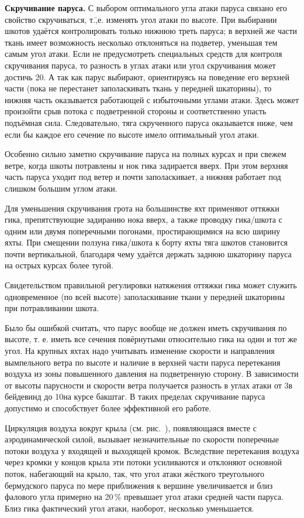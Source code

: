 \textbf{Скручивание паруса.}
 С выбором оптимального
угла атаки паруса связано его свойство скручиваться, т.\=,е. изменять
угол атаки по высоте. При выбирании шкотов удаётся контролировать
только нижнюю треть паруса; в верхней же части ткань имеет возможность
несколько отклоняться на подветер, уменьшая тем самым угол атаки. Если
не предусмотреть специальных средств для контроля скручивания паруса,
то разность в углах атаки или угол скручивания может достичь 20\gr. А
так как парус выбирают, ориентируясь на поведение его верхней части
(пока не перестанет заполаскивать ткань у передней шкаторины), то
нижняя часть оказывается работающей с избыточными углами атаки. Здесь
может произойти срыв потока с подветренной стороны и соответственно
упасть подъёмная сила. Следовательно, тяга скрученного паруса
оказывается ниже, чем если бы каждое его сечение по высоте имело
оптимальный угол атаки.

Особенно сильно заметно скручивание паруса на полных курсах и при
свежем ветре, когда шкоты потравлены и нок гика задирается вверх. При
этом верхняя часть паруса уходит под ветер и почти заполаскивает, а
нижняя работает под слишком большим углом атаки.

Для уменьшения скручивания грота на большинстве яхт применяют оттяжки
гика, препятствующие задиранию нока вверх, а также проводку
гика\-/шкота с одним или двумя поперечными погонами, простирающимися
на всю ширину яхты. При смещении ползуна гика\-/шкота к борту яхты
тяга шкотов становится почти вертикальной, благодаря чему удаётся
держать заднюю шкаторину паруса на острых курсах более тугой.

Свидетельством правильной регулировки натяжения оттяжки гика может
служить одновременное (по всей высоте) заполаскивание ткани у передней
шкаторины при потравливании шкота.

Было бы ошибкой считать, что парус вообще не должен иметь скручивания
по высоте, т. е. иметь все сечения повёрнутыми относительно гика на
один и тот же угол. На крупных яхтах надо учитывать изменение скорости
и направления вымпельного ветра по высоте и наличие в верхней части
паруса перетекания воздуха из зоны повышенного давления на
подветренную сторону. В зависимости от высоты парусности и скорости
ветра получается разность в углах атаки от 3\gr в бейдевинд до
10\gr на курсе бакштаг. В таких пределах скручивание паруса
допустимо и способствует более эффективной его работе.

Циркуляция воздуха вокруг крыла (см. рис.~), появляющаяся
вместе с аэродинамической силой, вызывает незначительные по скорости
поперечные потоки воздуха  у входящей и выходящей
кромок. Вследствие перетекания воздуха через кромки у концов крыла эти
потоки усиливаются и отклоняют основной поток, набегающий на крыло,
так, что угол атаки жёсткого треугольного бермудского паруса по мере
приближения к вершине увеличивается и близ фалового угла примерно на
20\,\% превышает угол атаки средней части паруса. Близ гика
фактический угол атаки, наоборот, несколько уменьшается.

